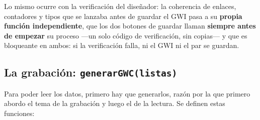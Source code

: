 Lo mismo ocurre con la verificación del diseñador: la coherencia de
enlaces, contadores y tipos que se lanzaba antes de guardar el GWI pasa a
su \textbf{propia función independiente}, que los dos botones de
guardar llaman \textbf{siempre antes de empezar} su proceso —un
solo código de verificación, sin copias— y que es bloqueante en
ambos: si la verificación falla, ni el GWI ni el par se guardan.

\subsection{La grabación: \texttt{generarGWC(listas)}}\label{sec:F5I6Grabacion}

Para poder leer los datos, primero hay que generarlos, razón por la
que primero abordo el tema de la grabación y luego el de la lectura.
Se definen estas funciones:

